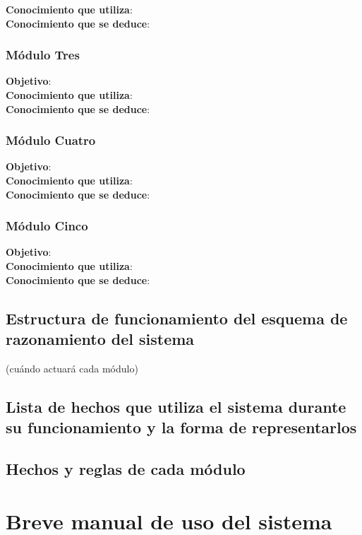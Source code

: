 \documentclass[12pt]{article}
\begin{document}
\textbf{Conocimiento que utiliza}: \\

\textbf{Conocimiento que se deduce}:

\subsubsection{Módulo Tres}
\textbf{Objetivo}: \\

\textbf{Conocimiento que utiliza}: \\

\textbf{Conocimiento que se deduce}:

\subsubsection{Módulo Cuatro}
\textbf{Objetivo}: \\

\textbf{Conocimiento que utiliza}: \\

\textbf{Conocimiento que se deduce}:

\subsubsection{Módulo Cinco}
\textbf{Objetivo}: \\

\textbf{Conocimiento que utiliza}: \\

\textbf{Conocimiento que se deduce}:

\subsection{Estructura de funcionamiento del esquema de razonamiento del sistema}
(cuándo actuará cada módulo)

\subsection{Lista de hechos que utiliza el sistema durante su funcionamiento y la forma de representarlos}

\subsection{Hechos y reglas de cada módulo}

\section{Breve manual de uso del sistema}
\end{document}
